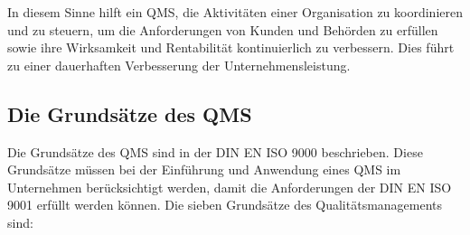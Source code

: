 \documentclass[11pt]{scrartcl}       %
\begin{document}
%

In diesem Sinne hilft ein QMS, die Aktivitäten einer Organisation zu koordinieren und zu steuern, um die Anforderungen von Kunden und Behörden zu erfüllen sowie ihre Wirksamkeit und Rentabilität kontinuierlich zu verbessern. Dies führt zu einer dauerhaften Verbesserung der Unternehmensleistung.

\subsection{Die Grundsätze des QMS}

Die Grundsätze des QMS sind in der DIN EN ISO 9000 beschrieben. Diese Grundsätze müssen bei der Einführung und Anwendung eines QMS im Unternehmen berücksichtigt werden, damit die Anforderungen der DIN EN ISO 9001 erfüllt werden können. Die sieben Grundsätze des Qualitätsmanagements \cite{mai2020grundlage} sind:
\end{document}
